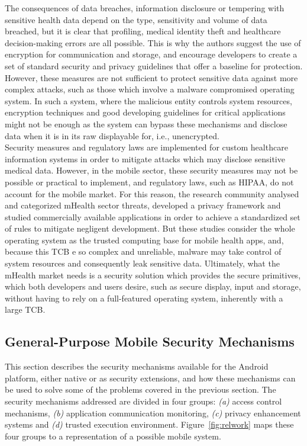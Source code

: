 The consequences of data breaches, information disclosure or tempering with sensitive health data depend on the type, sensitivity and volume of data breached, but it is clear that profiling, medical identity theft and healthcare decision-making errors are all possible. This is why the authors suggest the use of encryption for communication and storage, and encourage developers to create a set of standard security and privacy guidelines that offer a baseline for protection. However, these measures are not sufficient to protect sensitive data against more complex attacks, such as those which involve a malware compromised operating system. In such a system, where the malicious entity controls system resources, encryption techniques and good developing guidelines for critical applications might not be enough as the system can bypass these mechanisms and disclose data when it is in its raw displayable for, i.e., unencrypted.\\

Security measures and regulatory laws are implemented for custom healthcare information systems in order to mitigate attacks which may disclose sensitive medical data. However, in the mobile sector, these security measures may not be possible or practical to implement, and regulatory laws, such as \ac{HIPAA}, do not account for the mobile market. For this reason, the research community analysed and categorized mHealth sector threats, developed a privacy framework and studied commercially available applications in order to achieve a standardized set of rules to mitigate negligent development. But these studies consider the whole operating system as the trusted computing base for mobile health apps, and, because this \ac{TCB} e so complex and unreliable, malware may take control of system resources and consequently leak sensitive data. Ultimately, what the mHealth market needs is a security solution which provides the secure primitives, which both developers and users desire, such as secure display, input and storage, without having to rely on a full-featured operating system, inherently with a large \ac{TCB}.

\subsection{General-Purpose Mobile Security Mechanisms}

This section describes the security mechanisms available for the Android platform, either native or as security extensions, and how these mechanisms can be used to solve some of the problems covered in the previous section. The security mechanisms addressed are divided in four groups: \emph{(a)} access control mechanisms, \emph{(b)} application communication monitoring, \emph{(c)} privacy enhancement systems and \emph{(d)} trusted execution environment. Figure~\ref{fig:relwork} maps these four groups to a representation of a possible mobile system.

